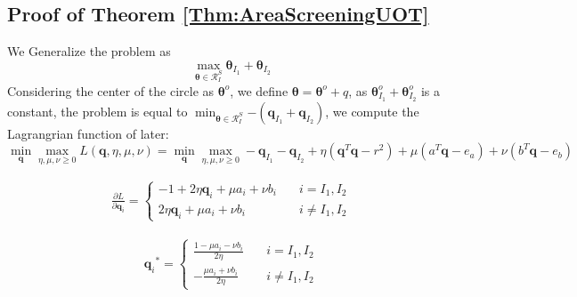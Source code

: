 \documentclass[twoside]{article}
\theoremstyle{plain}
\newcommand{\tranT}{T}
\renewcommand{\vec}[1]{\bm{#1}}
\begin{document}
\subsection{Proof of Theorem \ref{Thm:AreaScreeningUOT}}
We Generalize the problem as 
\begin{equation}
\max_{\vec{\theta} \in \mathcal{R}^{S}_{I}}{ \vec{\theta}_{I_1} +\vec{\theta}_{I_2} }
\end{equation}
Considering the center of the circle as $\vec{\theta}^o$, we define $\vec{\theta} = \vec{\theta}^{o} + q$, as ${ \vec{\theta}^{o}_{I_1} +\vec{\theta}^{o}_{I_2} }$ is a constant, the problem is equal to $\min_{\vec{\theta} \in \mathcal{R}^{S}_{I}}{- ( \vec{q}_{I_1} +\vec{q}_{I_2} )}$, we compute the Lagrangrian function of later:
\begin{equation}
\min_{\vec{q}} \max_{\eta,\mu,\nu \geq 0} L(\vec{q},\eta,\mu,\nu) =\min_{\vec{q}}\max_{\eta,\mu,\nu\geq0} - {\vec{q}_{I_1} - \vec{q}_{I_2} + \eta( \vec{q}^{\tranT}\vec{q} - r^2)+\mu( a^{\tranT}\vec{q} - e_a ) + \nu( b^{\tranT}\vec{q} - e_b )}
\end{equation}

 \begin{equation}
\begin{split} 
\frac{\partial L}{\partial \vec{q}_i} = \left\{
\begin{aligned}
-1 + 2\eta \vec{q}_i +\mu a_i + \nu b_i \quad& i = I_1, I_2\\
 2\eta \vec{q}_i +\mu a_i + \nu b_i \quad& i \neq I_1, I_2
\end{aligned}
\right.
 \end{split}
\label{eq:lang1}
\end{equation}

 \begin{equation}
\begin{split} 
{\vec{q}_i}^{*} = \left\{
\begin{aligned}
\frac{1- \mu a_i - \nu b_i}{2\eta} \quad& i = I_1, I_2\\
-\frac{\mu a_i + \nu b_i}{2\eta} \quad& i \neq I_1, I_2
\end{aligned}
\right.
 \end{split}
\label{eq:lang1}
\end{equation}
\end{document}
